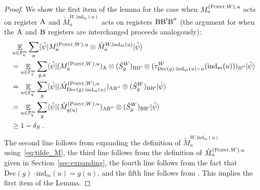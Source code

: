 \documentclass[11pt]{article}
\theoremstyle{definition}
\newcommand{\ket}[1]{|#1\rangle}
\newcommand{\bra}[1]{\langle#1|}
\newcommand{\F}{\ensuremath{\mathbb{F}}}
\newcommand{\ind}{\ensuremath{\mathrm{ind}}}
\newcommand{\E}{\mathop{\mathbb{E}}\displaylimits}
\newcommand{\labelstyle}[1]{\ensuremath{\textsc{#1}}\xspace}
\newcommand{\alice}{\labelstyle{A}}
\newcommand{\bob}{\labelstyle{B}}
\newcommand{\typestyle}[1]{\ensuremath{\textsc{#1}}\xspace}
\newcommand{\Point}{\typestyle{Point}}
\newcommand{\coded}{\mathrm{Dec}}
\begin{document}
\begin{proof}
We show the first item of the lemma for the case when $M^{(\Point,W),u}_a$ acts on register $\alice$ and $\tilde{M}^{W,\ind_m(u)}_a$ acts on registers $\bob \bob' \bob''$ (the argument for when the $\alice$ and $\bob$ registers are interchanged proceeds analogously):
	\begin{align*}
		&\E_{u \in \F_q^m} \sum_a \bra{\hat{\psi}} M^{(\Point,W),u}_a \otimes \tilde{M}^{W,\ind_m(u)}_a \ket{\hat{\psi}} \\
		&= \E_{u \in \F_q^m} \sum_{g,a} \bra{\hat{\psi}} (M^{(\Point,W),u}_a)_{\alice} \otimes (\hat{S}^W_g)_{\bob \bob'} \otimes (\tau^W_{\coded(g) \cdot \ind_m(u) -a}(\ind_m(u)))_{\bob''} \ket{\hat{\psi}} \\
		&= \E_{u \in \F_q^m} \sum_{g} \bra{\hat{\psi}} (\hat{M}^{(\Point,W),u}_{\coded(g) \cdot \ind_m(u)})_{\alice \bob''} \otimes (\hat{S}^W_g)_{\bob \bob'} \ket{\hat{\psi}} \\
		&= \E_{u \in \F_q^m} \sum_{g} \bra{\hat{\psi}} (\hat{M}^{(\Point,W),u}_{g(u)})_{\alice \bob''} \otimes (\hat{S}^W_g)_{\bob \bob'} \ket{\hat{\psi}} \\
		&\geq 1 - \delta_S\;.
	\end{align*}
	The second line follows from expanding the definition of $\tilde{M}^{W,\ind_m(u)}_a$ using~\eqref{eq:tilde_M}, the third line follows from the definition of $\hat{M}^{(\Point,W),u}_a$ given in Section~\ref{sec:expanding}, the fourth line follows from the fact that $\coded(g) \cdot \ind_m(u) = g(u)$, and the fifth line follows from . This implies the first item of the Lemma.



\end{proof}
\end{document}
